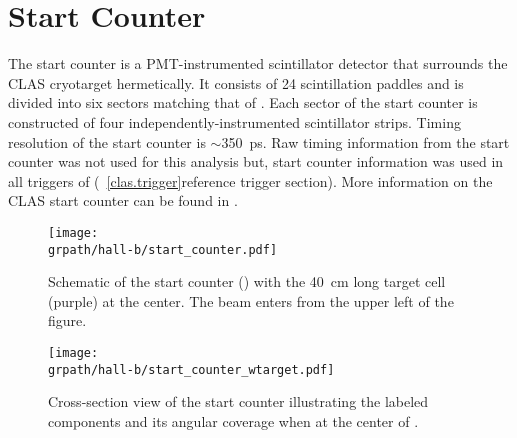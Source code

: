 \section{Start Counter}\label{sec:clas.st}

The start counter is a PMT-instrumented scintillator detector that surrounds the CLAS cryotarget hermetically. It consists of 24 scintillation paddles and is divided into six sectors matching that of . Each sector of the start counter is constructed of four independently-instrumented scintillator strips. Timing resolution of the start counter is $\sim$350~ps. Raw timing information from the start counter was not used for this analysis but, start counter information was used in all triggers of  (~\ref{clas.trigger}reference trigger section). More information on the CLAS start counter can be found in \cite{clas.st}.

\begin{figure}[h!]\begin{center}
\texttt{[image: \\grpath/hall-b/start\_counter.pdf]}
\caption[Start Counter Schematic]{\label{fig:clas.st}{}Schematic of the start counter () with the 40~cm long target cell (purple) at the center. The beam enters from the upper left of the figure.}
\end{center}\end{figure}

\begin{figure}[h!]\begin{center}
\texttt{[image: \\grpath/hall-b/start\_counter\_wtarget.pdf]}
\caption[Start Counter Schematic]{\label{fig:clas.stxsection}{}Cross-section view of the start counter illustrating the labeled components and its angular coverage when at the center of .}
\end{center}\end{figure}


